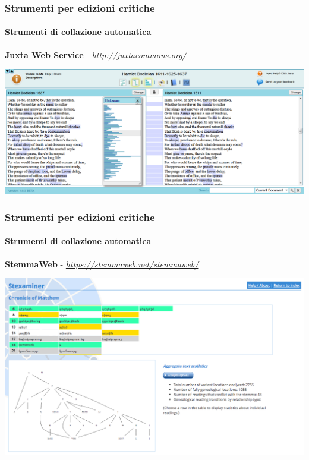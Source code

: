 \begin{frame}
    \frametitle{Strumenti per edizioni critiche}
    \framesubtitle{Strumenti di collazione automatica}
	\addtocounter{nframe}{1}
    \begin{center}
        \textbf{Juxta Web Service} -  \textit{\url{http://juxtacommons.org/}}
    \end{center}
    \begin{center}
        \includegraphics[width=.95\textwidth]{imgs/juxtaweb.png}
	\end{center}
\end{frame}

\begin{frame}
    \frametitle{Strumenti per edizioni critiche}
    \framesubtitle{Strumenti di collazione automatica}
	\addtocounter{nframe}{1}
    \begin{center}
        \textbf{StemmaWeb} - \textit{\url{https://stemmaweb.net/stemmaweb/}}
    \end{center}
    \begin{center}
        \includegraphics[width=.95\textwidth]{imgs/stemmaweb.png}
	\end{center}
\end{frame}

